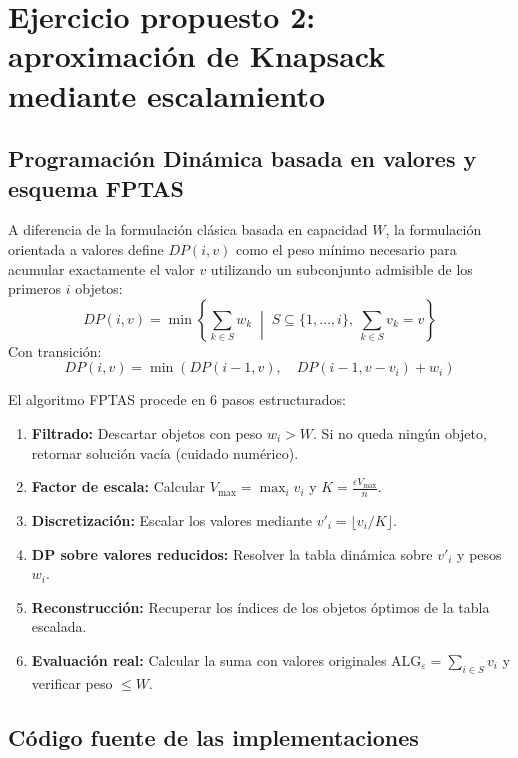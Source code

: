 \section{Ejercicio propuesto 2: aproximación de Knapsack mediante escalamiento}

\subsection{Programación Dinámica basada en valores y esquema FPTAS}
A diferencia de la formulación clásica basada en capacidad $W$, la formulación orientada a valores define $DP(i, v)$ como el peso mínimo necesario para acumular exactamente el valor $v$ utilizando un subconjunto admisible de los primeros $i$ objetos:
\begin{equation}
    DP(i, v) = \min \left\{ \sum_{k \in S} w_k \;\middle|\; S \subseteq \{1, \dots, i\}, \ \sum_{k \in S} v_k = v \right\}
\end{equation}
Con transición:
\begin{equation}
    DP(i, v) = \min\left( DP(i - 1, v), \quad DP(i - 1, v - v_i) + w_i \right)
\end{equation}

El algoritmo FPTAS procede en 6 pasos estructurados:
\begin{enumerate}
    \item \textbf{Filtrado:} Descartar objetos con peso $w_i > W$. Si no queda ningún objeto, retornar solución vacía (cuidado numérico).
    \item \textbf{Factor de escala:} Calcular $V_{\max} = \max_i v_i$ y $K = \frac{\varepsilon V_{\max}}{n}$.
    \item \textbf{Discretización:} Escalar los valores mediante $v'_i = \lfloor v_i / K \rfloor$.
    \item \textbf{DP sobre valores reducidos:} Resolver la tabla dinámica sobre $v'_i$ y pesos $w_i$.
    \item \textbf{Reconstrucción:} Recuperar los índices de los objetos óptimos de la tabla escalada.
    \item \textbf{Evaluación real:} Calcular la suma con valores originales $\text{ALG}_\varepsilon = \sum_{i \in S} v_i$ y verificar peso $\le W$.
\end{enumerate}

\subsection{Código fuente de las implementaciones}

